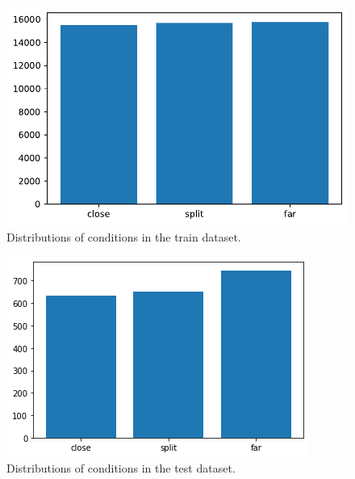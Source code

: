 \clearpage

\begin{figure}[ht]
  \centering
  \includegraphics[width=\columnwidth]{assets/trainset_conditions.pdf}
  \caption[Train dataset words]{Distributions of conditions in the train dataset.}
  \label{figure:trainset-conditions}
\end{figure}

\begin{figure}[ht]
  \centering
  \includegraphics[width=\columnwidth]{assets/testset_conditions.png}
  \caption[Test dataset words]{Distributions of conditions in the test dataset.}
  \label{figure:testset-conditions}
\end{figure}
